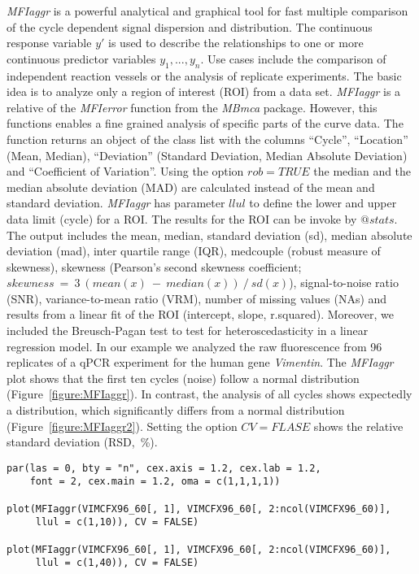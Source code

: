\documentclass[twocolumn]{bmcart}%
\begin{document}
 \textsl{MFIaggr} is a powerful analytical and graphical tool for fast multiple 
comparison of the cycle dependent signal dispersion and distribution. The 
continuous response variable $y'$ is used to describe the relationships to one 
or more continuous predictor variables $y_1, ..., y_n$. Use cases include the 
comparison of independent reaction vessels or the analysis of replicate 
experiments. The basic idea is to analyze only a region of interest (ROI) from a 
data set. \textsl{MFIaggr} is a relative of the \textsl{MFIerror} function from 
the \emph{MBmca} package. However, this functions enables a fine grained 
analysis of specific parts of the curve data. The function returns an object of 
the class list with the columns ``Cycle'', ``Location'' (Mean, Median), 
``Deviation'' (Standard Deviation, Median Absolute Deviation) and ``Coefficient 
of Variation''. Using the option $rob = TRUE$ the median and the median absolute 
deviation (MAD) are calculated instead of the mean and standard deviation. 
\textsl{MFIaggr} has parameter $llul$ to define the lower and upper data limit 
(cycle) for a ROI. The results for the ROI can be invoke by $@stats$. The output 
includes the mean, median, standard deviation (sd), median absolute deviation 
(mad), inter quartile range (IQR), medcouple (robust measure of skewness), 
skewness (Pearson's second skewness coefficient; 
$skewness~=~3~(mean(x)~-~median(x))~/~sd(x)$), signal-to-noise ratio (SNR), 
variance-to-mean ratio (VRM), number of missing values (NAs) and results from a 
linear fit of the ROI (intercept, slope, r.squared). Moreover, we included 
the Breusch-Pagan test to test for heteroscedasticity in a linear regression 
model. In our example we analyzed the raw fluorescence from 96 replicates of a 
qPCR experiment for the human gene \textit{Vimentin}. The \textsl{MFIaggr} plot 
shows that the first ten cycles (noise) follow a normal distribution 
(Figure~\ref{figure:MFIaggr}). In contrast, the analysis of all cycles shows 
expectedly a distribution, which significantly differs from a normal 
distribution (Figure~\ref{figure:MFIaggr2}). Setting the option $CV = FLASE$ 
shows the relative standard deviation (RSD,~\%).

\begin{figure*}
\begin{verbatim}
par(las = 0, bty = "n", cex.axis = 1.2, cex.lab = 1.2, 
    font = 2, cex.main = 1.2, oma = c(1,1,1,1))

plot(MFIaggr(VIMCFX96_60[, 1], VIMCFX96_60[, 2:ncol(VIMCFX96_60)], 
     llul = c(1,10)), CV = FALSE)

plot(MFIaggr(VIMCFX96_60[, 1], VIMCFX96_60[, 2:ncol(VIMCFX96_60)], 
     llul = c(1,40)), CV = FALSE)
\end{verbatim}
\end{figure*}
\end{document}
